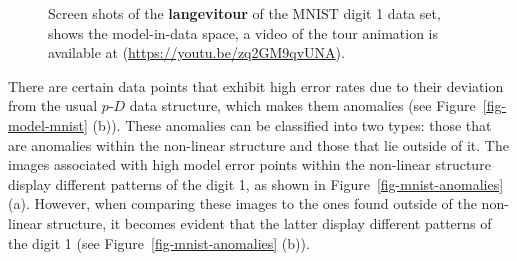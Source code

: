 \documentclass[
  12pt]{article}
\newcommand\pD{$p\text{-}D$}
\begin{document}
\begin{figure}[H]
\begin{minipage}{0.33\linewidth}
{}

\subcaption{\label{fig-mnist1_sc2}}

\end{minipage}%
%
\begin{minipage}{0.33\linewidth}


\subcaption{\label{fig-mnist1_sc3}}

\end{minipage}%

\caption{\label{fig-mnist1_sc}Screen shots of the \textbf{langevitour}
of the MNIST digit 1 data set, shows the model-in-data space, a video of
the tour animation is available at
(\url{https://youtu.be/zq2GM9qvUNA}).}

\end{figure}%

There are certain data points that exhibit high error rates due to their
deviation from the usual \pD{} data structure, which makes them
anomalies (see Figure~\ref{fig-model-mnist} (b)). These anomalies can be
classified into two types: those that are anomalies within the
non-linear structure and those that lie outside of it. The images
associated with high model error points within the non-linear structure
display different patterns of the digit 1, as shown in
Figure~\ref{fig-mnist-anomalies} (a). However, when comparing these
images to the ones found outside of the non-linear structure, it becomes
evident that the latter display different patterns of the digit 1 (see
Figure~\ref{fig-mnist-anomalies} (b)).
\end{document}
